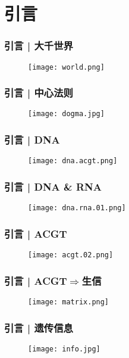 \section{引言}
\begin{frame}
  \frametitle{引言 | 大千世界}
  \begin{figure}
    \centering
    \texttt{[image: world.png]}
  \end{figure}
\end{frame}

\begin{frame}
  \frametitle{引言 | 中心法则}
  \begin{figure}
    \centering
    \texttt{[image: dogma.jpg]}
  \end{figure}
\end{frame}

\begin{frame}
  \frametitle{引言 | DNA}
  \begin{figure}
    \centering
    \texttt{[image: dna.acgt.png]}
  \end{figure}
\end{frame}

\begin{frame}
  \frametitle{引言 | DNA \& RNA}
  \begin{figure}
    \centering
    \texttt{[image: dna.rna.01.png]}
  \end{figure}
\end{frame}

\begin{frame}
  \frametitle{引言 | ACGT}
  \begin{figure}
    \centering
    \texttt{[image: acgt.02.png]}
  \end{figure}
\end{frame}

\begin{frame}
  \frametitle{引言 | ACGT$\Rightarrow$生信}
  \begin{figure}
    \centering
    \texttt{[image: matrix.png]}
  \end{figure}
\end{frame}

\begin{frame}
  \frametitle{引言 | \alert{遗传信息}}
  \begin{figure}
    \centering
    \texttt{[image: info.jpg]}
  \end{figure}
\end{frame}

